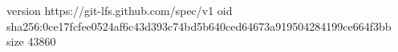 version https://git-lfs.github.com/spec/v1
oid sha256:0ce17fcfee0524af6c43d393c74bd5b640ced64673a919504284199ce664f3bb
size 43860
